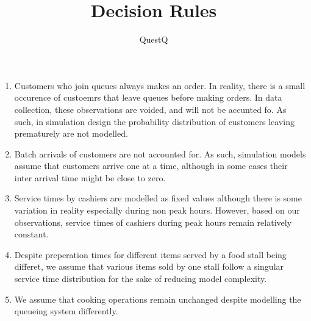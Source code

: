 \documentclass{article}
\begin{document}
\pagecolor{ultramarine}
\title{Decision Rules}
\author{QuestQ}
\date{}
\maketitle
\begin{enumerate}
    \item Customers who join queues always makes an order. In reality, there is a small occurence of custoemrs that leave queues before making orders. In data collection, these observations are voided, and will not be accunted fo. As such, in simulation design the probability distribution of customers leaving prematurely are not modelled.
    \item Batch arrivals of customers are not accounted for. As such, simulation models assume that customers arrive one at a time, although in some cases their inter arrival time might be close to zero.
    \item Service times by cashiers are modelled as fixed values although there is some variation in reality especially during non peak hours. However, based on our observations, service times of cashiers during peak hours remain relatively constant.
    \item Despite preperation times for different items served by a food stall being differet, we assume that various items sold by one stall follow a singular service time distribution for the sake of reducing model complexity.
    \item We assume that cooking operations remain unchanged despite modelling the queueing system differently.
\end{enumerate}
\end{document}

